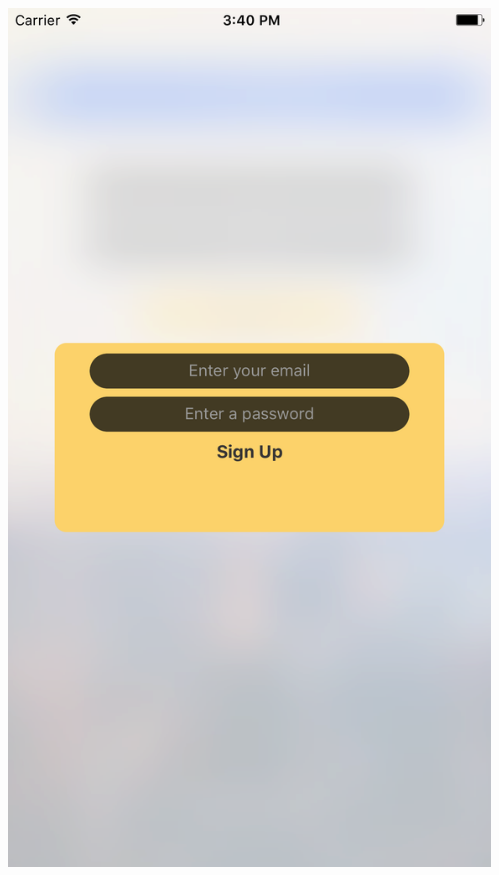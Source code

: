 \documentclass{beamer}
\begin{document}
\begin{frame}
\begin{columns}
\begin{column}{0.3\textwidth}
\begin{center}
        \end{center}
    \end{column}
    \begin{column}{0.3\textwidth}  %
        \begin{center}
            \includegraphics[scale=0.08]{registration}
        \end{center}
    \end{column}
\end{columns}
\end{frame}
\end{document}
